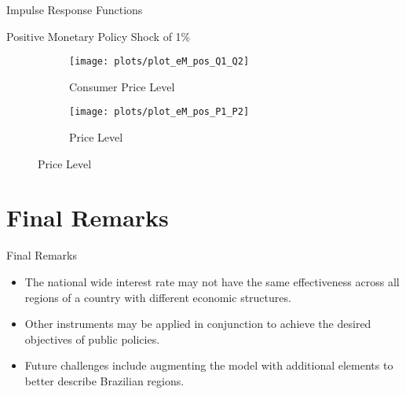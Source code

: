 \documentclass[../quali_slides.tex]{subfiles}
\begin{document}
\begin{frame}{Impulse Response Functions}

\center Positive Monetary Policy Shock of 1\%
	
	\begin{figure}[h!]
		\centering
		\begin{subfigure}[b]{0.45\textwidth}
			\centering
			\texttt{[image: plots/plot\_eM\_pos\_Q1\_Q2]}
			\caption{\scriptsize Consumer Price Level}
			\label{fig:plot_eM_pos_Q1_Q2}
		\end{subfigure}
		\hspace*{0.3cm}
		\begin{subfigure}[b]{0.45\textwidth}
			\centering
			\texttt{[image: plots/plot\_eM\_pos\_P1\_P2]}
			\caption{\scriptsize Price Level}
			\label{fig:plot_eM_pos_P1_P2}
		\end{subfigure}
	\end{figure}
	
\end{frame}


\section{Final Remarks}

\begin{frame}{Final Remarks}
	
	\begin{itemize}
		
		\item The national wide interest rate may not have the same effectiveness across all regions of a country with different economic structures.
		
		\item Other instruments may be applied in conjunction to achieve the desired objectives of public policies.
		
		\item Future challenges include augmenting the model with additional elements to better describe Brazilian regions.
		
	\end{itemize}
	
\end{frame}
\end{document}
